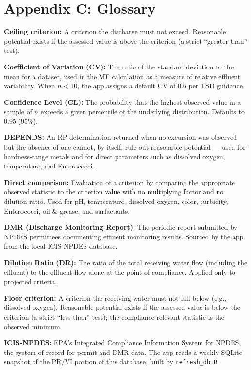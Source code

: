 \documentclass[
  11pt,
  letterpaper,
  DIV=11,
  numbers=noendperiod]{scrartcl}
\begin{document}
\section{Appendix C: Glossary}\label{sec-appendix-glossary}

\textbf{Ceiling criterion:} A criterion the discharge must not exceed.
Reasonable potential exists if the assessed value is above the criterion
(a strict ``greater than'' test).

\textbf{Coefficient of Variation (CV):} The ratio of the standard
deviation to the mean for a dataset, used in the MF calculation as a
measure of relative effluent variability. When \(n < 10\), the app
assigns a default CV of 0.6 per TSD guidance.

\textbf{Confidence Level (CL):} The probability that the highest
observed value in a sample of \(n\) exceeds a given percentile of the
underlying distribution. Defaults to 0.95 (95\%).

\textbf{DEPENDS:} An RP determination returned when no excursion was
observed but the absence of one cannot, by itself, rule out reasonable
potential --- used for hardness-range metals and for direct parameters
such as dissolved oxygen, temperature, and Enterococci.

\textbf{Direct comparison:} Evaluation of a criterion by comparing the
appropriate observed statistic to the criterion value with no
multiplying factor and no dilution ratio. Used for pH, temperature,
dissolved oxygen, color, turbidity, Enterococci, oil \& grease, and
surfactants.

\textbf{DMR (Discharge Monitoring Report):} The periodic report
submitted by NPDES permittees documenting effluent monitoring results.
Sourced by the app from the local ICIS-NPDES database.

\textbf{Dilution Ratio (DR):} The ratio of the total receiving water
flow (including the effluent) to the effluent flow alone at the point of
compliance. Applied only to projected criteria.

\textbf{Floor criterion:} A criterion the receiving water must not fall
below (e.g., dissolved oxygen). Reasonable potential exists if the
assessed value is below the criterion (a strict ``less than'' test); the
compliance-relevant statistic is the observed minimum.

\textbf{ICIS-NPDES:} EPA's Integrated Compliance Information System for
NPDES, the system of record for permit and DMR data. The app reads a
weekly SQLite snapshot of the PR/VI portion of this database, built by
\texttt{refresh\_db.R}.
\end{document}

